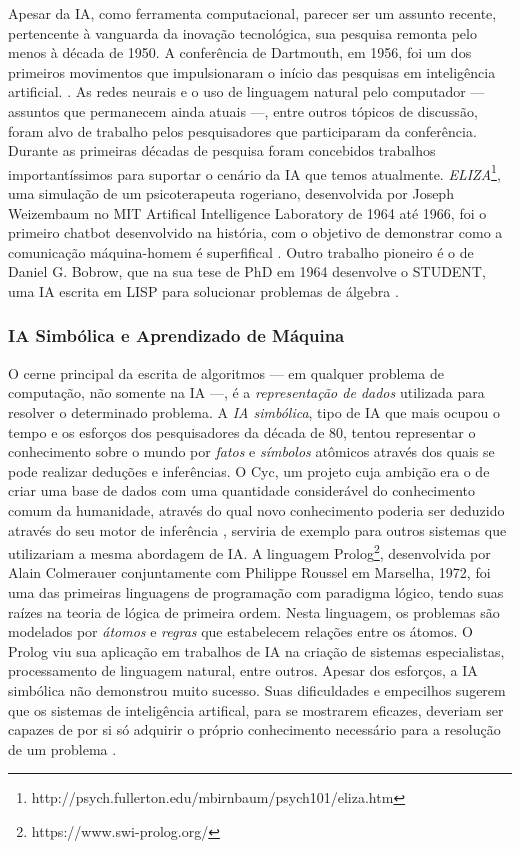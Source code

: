 \documentclass[12pt, a4paper]{article}
\begin{document}
Apesar da IA, como ferramenta computacional, parecer ser um assunto recente, 
pertencente à vanguarda da inovação tecnológica, sua pesquisa
remonta pelo menos à década de 1950.
A conferência de Dartmouth, em 1956, foi um dos primeiros movimentos que impulsionaram o início das 
pesquisas em inteligência artificial. \cite{dartmouth}.
As redes neurais e o uso de linguagem natural pelo computador --- assuntos que permanecem ainda atuais ---, entre outros tópicos de discussão,
foram alvo de trabalho pelos pesquisadores que participaram da conferência. 
Durante as primeiras décadas de pesquisa foram concebidos trabalhos importantíssimos para suportar o cenário da IA que temos atualmente.
\emph{ELIZA}\footnote{http://psych.fullerton.edu/mbirnbaum/psych101/eliza.htm}, 
uma simulação de um psicoterapeuta rogeriano, desenvolvida por Joseph Weizembaum no MIT Artifical Intelligence Laboratory de 1964 até 1966,
foi o primeiro chatbot desenvolvido na história, com o objetivo de demonstrar como a comunicação máquina-homem é superfifical \cite{wiezembaum}.
Outro trabalho pioneiro é o de Daniel G. Bobrow, que na sua tese de PhD em 1964 desenvolve o STUDENT, uma IA escrita em LISP para solucionar problemas
de álgebra \cite{student}.

\subsubsection{IA Simbólica e Aprendizado de Máquina}

O cerne principal da escrita de algoritmos --- em qualquer problema de computação, não somente na IA ---, 
é a \emph{representação de dados} utilizada para resolver o determinado problema. A \emph{IA simbólica},
tipo de IA que mais ocupou o tempo e os esforços dos pesquisadores da década de 80, tentou representar o conhecimento
sobre o mundo por \emph{fatos} e \emph{símbolos} atômicos através dos quais se pode realizar deduções e inferências. 
O Cyc, um projeto cuja ambição era o de criar uma
base de dados com uma quantidade considerável do conhecimento comum da humanidade, através do qual
novo conhecimento poderia ser deduzido através do seu motor de inferência \cite{cyc}, serviria de exemplo para outros sistemas
que utilizariam a mesma abordagem de IA. A linguagem Prolog\footnote{https://www.swi-prolog.org/}, 
desenvolvida por Alain Colmerauer conjuntamente com Philippe Roussel em Marselha, 1972, 
foi uma das primeiras linguagens de programação com paradigma lógico, tendo suas raízes na teoria de lógica de primeira ordem.
Nesta linguagem, os problemas são modelados por \emph{átomos} e \emph{regras} que estabelecem relações entre os átomos.
O Prolog viu sua aplicação em trabalhos de IA na criação de sistemas especialistas, processamento de linguagem natural, entre outros. 
Apesar dos esforços, a IA simbólica não demonstrou muito sucesso. Suas dificuldades e empecilhos sugerem que os sistemas de inteligência
artifical, para se mostrarem eficazes, deveriam ser capazes de por si só adquirir o próprio conhecimento necessário
para a resolução de um problema \cite{Goodfellow-et-al-2016}.
\end{document}
